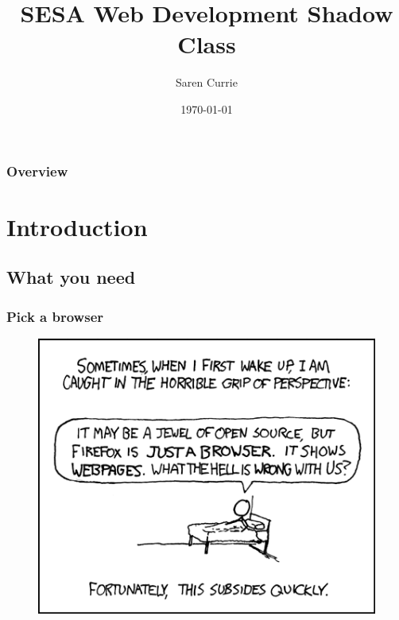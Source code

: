 \documentclass{beamer}
\title[Introduction to Web Development]{SESA Web Development Shadow Class} %
\author{Saren Currie} %
\institute[SESA] %
{
Software Engineering Students' Association \\ %
\medskip
\textit{saren@sarencurrie.com} %
}
\date{\today} %
\begin{document}
\begin{frame}
\titlepage %
\end{frame}

\begin{frame}
\frametitle{Overview} %
\tableofcontents %
\end{frame}


\section{Introduction} %


\subsection{What you need} %

\begin{frame}
\frametitle{Pick a browser}

\begin{figure}
\includegraphics[width=0.8\linewidth]{img/perspective.png}
\end{figure}

\end{frame}
\end{document}
